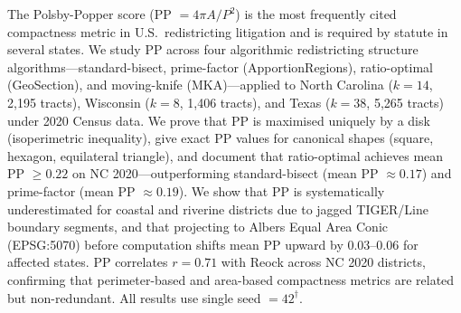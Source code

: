 The Polsby-Popper score (PP $= 4\pi A / P^2$) is the most frequently cited compactness
metric in U.S.\ redistricting litigation and is required by statute in several states.
We study PP across four algorithmic redistricting structure algorithms---standard-bisect,
prime-factor (ApportionRegions), ratio-optimal (GeoSection), and moving-knife (MKA)---applied
to North Carolina ($k=14$, 2{,}195 tracts), Wisconsin ($k=8$, 1{,}406 tracts),
and Texas ($k=38$, 5{,}265 tracts) under 2020 Census data.
We prove that PP is maximised uniquely by a disk (isoperimetric inequality),
give exact PP values for canonical shapes (square, hexagon, equilateral triangle),
and document that ratio-optimal achieves mean PP $\geq 0.22$ on NC 2020---outperforming
standard-bisect (mean PP $\approx 0.17$) and prime-factor (mean PP $\approx 0.19$).
We show that PP is systematically underestimated for coastal and riverine districts
due to jagged TIGER/Line boundary segments, and that projecting to Albers Equal Area
Conic (EPSG:5070) before computation shifts mean PP upward by $0.03$--$0.06$
for affected states.
PP correlates $r = 0.71$ with Reock across NC 2020 districts, confirming that
perimeter-based and area-based compactness metrics are related but non-redundant.
All results use single seed $= 42^\dagger$.

